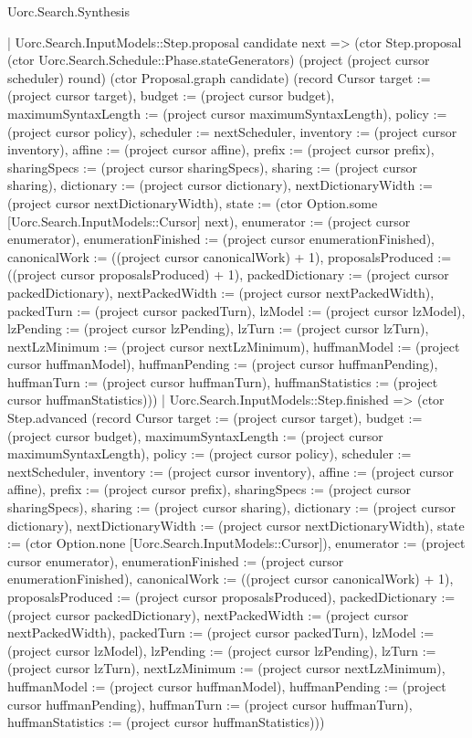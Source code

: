 \begin{lexlean}{Uorc.Search.Synthesis}
\begin{semanticmodule}
{          | Uorc.Search.InputModels::Step.proposal candidate next => (ctor Step.proposal (ctor Uorc.Search.Schedule::Phase.stateGenerators) (project (project cursor scheduler) round) (ctor Proposal.graph candidate) (record Cursor {target := (project cursor target), budget := (project cursor budget), maximumSyntaxLength := (project cursor maximumSyntaxLength), policy := (project cursor policy), scheduler := nextScheduler, inventory := (project cursor inventory), affine := (project cursor affine), prefix := (project cursor prefix), sharingSpecs := (project cursor sharingSpecs), sharing := (project cursor sharing), dictionary := (project cursor dictionary), nextDictionaryWidth := (project cursor nextDictionaryWidth), state := (ctor Option.some [Uorc.Search.InputModels::Cursor] next), enumerator := (project cursor enumerator), enumerationFinished := (project cursor enumerationFinished), canonicalWork := ((project cursor canonicalWork) + 1), proposalsProduced := ((project cursor proposalsProduced) + 1), packedDictionary := (project cursor packedDictionary), nextPackedWidth := (project cursor nextPackedWidth), packedTurn := (project cursor packedTurn), lzModel := (project cursor lzModel), lzPending := (project cursor lzPending), lzTurn := (project cursor lzTurn), nextLzMinimum := (project cursor nextLzMinimum), huffmanModel := (project cursor huffmanModel), huffmanPending := (project cursor huffmanPending), huffmanTurn := (project cursor huffmanTurn), huffmanStatistics := (project cursor huffmanStatistics)}))
          | Uorc.Search.InputModels::Step.finished => (ctor Step.advanced (record Cursor {target := (project cursor target), budget := (project cursor budget), maximumSyntaxLength := (project cursor maximumSyntaxLength), policy := (project cursor policy), scheduler := nextScheduler, inventory := (project cursor inventory), affine := (project cursor affine), prefix := (project cursor prefix), sharingSpecs := (project cursor sharingSpecs), sharing := (project cursor sharing), dictionary := (project cursor dictionary), nextDictionaryWidth := (project cursor nextDictionaryWidth), state := (ctor Option.none [Uorc.Search.InputModels::Cursor]), enumerator := (project cursor enumerator), enumerationFinished := (project cursor enumerationFinished), canonicalWork := ((project cursor canonicalWork) + 1), proposalsProduced := (project cursor proposalsProduced), packedDictionary := (project cursor packedDictionary), nextPackedWidth := (project cursor nextPackedWidth), packedTurn := (project cursor packedTurn), lzModel := (project cursor lzModel), lzPending := (project cursor lzPending), lzTurn := (project cursor lzTurn), nextLzMinimum := (project cursor nextLzMinimum), huffmanModel := (project cursor huffmanModel), huffmanPending := (project cursor huffmanPending), huffmanTurn := (project cursor huffmanTurn), huffmanStatistics := (project cursor huffmanStatistics)}))
}
\end{semanticmodule}
\end{lexlean}
